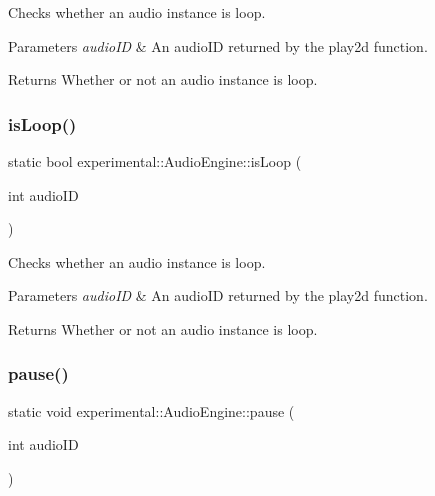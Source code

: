 Checks whether an audio instance is loop.


\begin{DoxyParams}{Parameters}
{\em audio\+ID} & An audio\+ID returned by the play2d function. \\
\hline
\end{DoxyParams}
\begin{DoxyReturn}{Returns}
Whether or not an audio instance is loop. 
\end{DoxyReturn}
\mbox{\label{classexperimental_1_1AudioEngine_a7a636855b8bd54af196a9f6947791d3b}} 
\subsubsection{\texorpdfstring{is\+Loop()}{isLoop()}\hspace{0.1cm}{\footnotesize\ttfamily [2/2]}}
{\footnotesize\ttfamily static bool experimental\+::\+Audio\+Engine\+::is\+Loop (\begin{DoxyParamCaption}\item[{int}]{audio\+ID }\end{DoxyParamCaption})\hspace{0.3cm}{\ttfamily [static]}}

Checks whether an audio instance is loop.


\begin{DoxyParams}{Parameters}
{\em audio\+ID} & An audio\+ID returned by the play2d function. \\
\hline
\end{DoxyParams}
\begin{DoxyReturn}{Returns}
Whether or not an audio instance is loop. 
\end{DoxyReturn}
\mbox{\label{classexperimental_1_1AudioEngine_a1989c81a914d8f927c4f2decfacd3a96}} 
\subsubsection{\texorpdfstring{pause()}{pause()}\hspace{0.1cm}{\footnotesize\ttfamily [1/2]}}
{\footnotesize\ttfamily static void experimental\+::\+Audio\+Engine\+::pause (\begin{DoxyParamCaption}\item[{int}]{audio\+ID }\end{DoxyParamCaption})\hspace{0.3cm}{\ttfamily [static]}}

